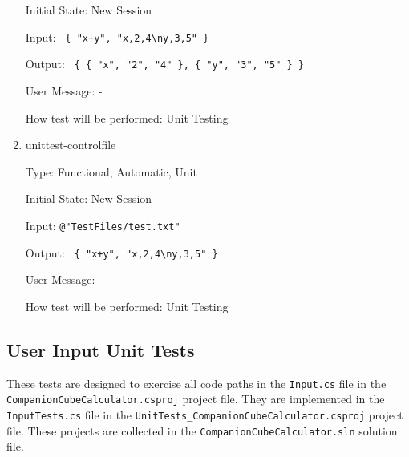 \documentclass[12pt, titlepage]{article}
\begin{document}
\begin{enumerate}
	Initial State: New Session
	
	Input: \texttt{ \{ "x+y", "x,2,4\textbackslash ny,3,5" \} }
	
	Output: \texttt{ \{ \{ "x", "2", "4" \}, \{ "y", "3", "5" \} \}}
	
	User Message: -
	
	How test will be performed: Unit Testing\\
	
	\item{unittest-controlfile}
	
	Type: Functional, Automatic, Unit
	
	Initial State: New Session
	
	Input: \texttt{@"TestFiles/test.txt"}
	
	Output: \texttt{ \{ "x+y", "x,2,4\textbackslash ny,3,5" \} }
	
	User Message: -
	
	How test will be performed: Unit Testing\\
	
\end{enumerate}

\subsection{User Input Unit Tests}
\label{unit_inputs}
These tests are designed to exercise all code paths in the \texttt{Input.cs} 
file in the \texttt{CompanionCubeCalculator.csproj} project file. They are 
implemented in the \texttt{InputTests.cs} file in the 
\texttt{UnitTests\_CompanionCubeCalculator.csproj} project file. These projects 
are collected in the \texttt{CompanionCubeCalculator.sln} solution file.
\end{document}
